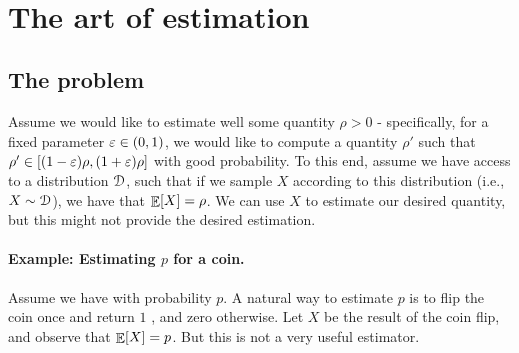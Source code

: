 \makeatletter
{}
\makeatother
\ifx\bookMode\undefined%
\fi



\BookMode{\newpage}%

\noindent%



\noindent%
\ChapterPrefix{}%
\ChapterGen{}

~


\bigskip%


\section{The art of estimation}

\subsection{The problem}
Assume we would like to estimate well some quantity $\rho > 0$ -
specifically, for a fixed parameter ${\varepsilon} \in (0,1)$, we would like to
compute a quantity $\rho'$ such that
$\rho' \in [(1-{\varepsilon})\rho, (1+{\varepsilon})\rho]$ with good probability.  To
this end, assume we have access to a distribution $\EuScript{D}$,
such that if we sample $X$ according to this distribution (i.e.,
$X \sim \EuScript{D}$), we have that $\mathop{\mathbb{E}}\!\left[ {X} \right] = \rho$. We can use $X$
to estimate our desired quantity, but this might not provide the
desired estimation.


\paragraph*{Example: Estimating $p$ for a coin.}
Assume we have  with probability $p$. A natural way
to estimate $p$ is to flip the coin once and return $1$ ,
and zero otherwise.  Let $X$ be the result of the coin flip, and
observe that $\mathop{\mathbb{E}}\!\left[ {X} \right] = p$. But this is not a very useful estimator.



